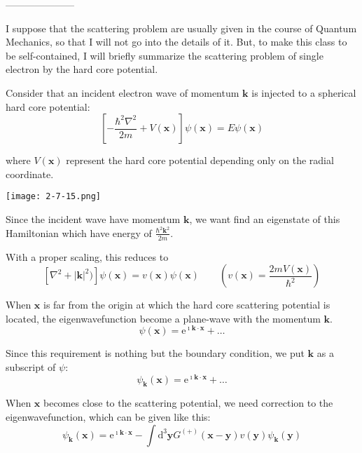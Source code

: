 \begin{center}---------------------\end{center}

I suppose that the scattering problem are usually given in the course of Quantum Mechanics, so that I will not go into the details of it. But, to make this class to be self-contained, I will briefly summarize the scattering problem of single electron by the hard core potential.

Consider that an incident electron wave of momentum $\mathbf{k}$ is injected to a spherical hard core potential:
\begin{equation*} \label{Eqs2.7.A.1} \tag{2.7.A.1}
\left[ -\frac{\hbar^2\nabla^2}{2m}+ V(\mathbf{x}) \right] \psi(\mathbf{x}) = E \psi(\mathbf{x})
\end{equation*}

where $V(\mathbf{x})$ represent the hard core potential depending only on the radial coordinate.
\begin{center} \texttt{[image: 2-7-15.png]} \label{Fig2.7.15} \end{center}

Since the incident wave have momentum $\mathbf{k}$, we want find an eigenstate of this Hamiltonian which have energy of $\frac{\hbar^2\mathbf{k}^2}{2m}$.

With a proper scaling, this reduces to
\begin{equation*} \label{Eqs2.7.A.1'} \tag{2.7.A.1'}
\left[ \nabla^2+ |\mathbf{k}|^2) \right] \psi(\mathbf{x}) = v(\mathbf{x}) \psi(\mathbf{x}) \qquad \left(v(\mathbf{x})=\frac{2mV(\mathbf{x})}{\hbar^2}\right)
\end{equation*}

When $\mathbf{x}$ is far from the origin at which the hard core scattering potential is located, the eigenwavefunction become a plane-wave with the momentum $\mathbf{k}$.
\[ \psi(\mathbf{x}) = \mathrm{e}^{\imath \mathbf{k}\cdot \mathbf{x}} + \ldots \]

Since this requirement is nothing but the boundary condition, we put $\mathbf{k}$ as a subscript of $\psi$:
\[ \psi_\mathbf{k}(\mathbf{x}) = \mathrm{e}^{\imath \mathbf{k}\cdot \mathbf{x}} + \ldots \]

When $\mathbf{x}$ becomes close to the scattering potential, we need correction to the eigenwavefunction, which can be given like this:
\begin{equation*} \label{Eqs2.7.A.2} \tag{2.7.A.2} \psi_\mathbf{k}(\mathbf{x}) = \mathrm{e}^{\imath \mathbf{k}\cdot \mathbf{x}} - \int \mathrm{d}^3 \mathbf{y} G^{(+)}(\mathbf{x}-\mathbf{y}) v(\mathbf{y}) \psi_{\mathbf{k}}(\mathbf{y})
\end{equation*}

